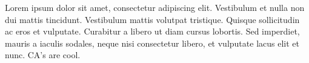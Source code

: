 Lorem ipsum dolor sit amet, consectetur adipiscing elit.
Vestibulum et nulla non dui mattis tincidunt.
Vestibulum mattis volutpat tristique.
Quisque sollicitudin ac eros et vulputate.
Curabitur a libero ut diam cursus lobortis.
Sed imperdiet, mauris a iaculis sodales, neque nisi consectetur libero, et vulputate lacus elit et nunc.
CA's are cool.
